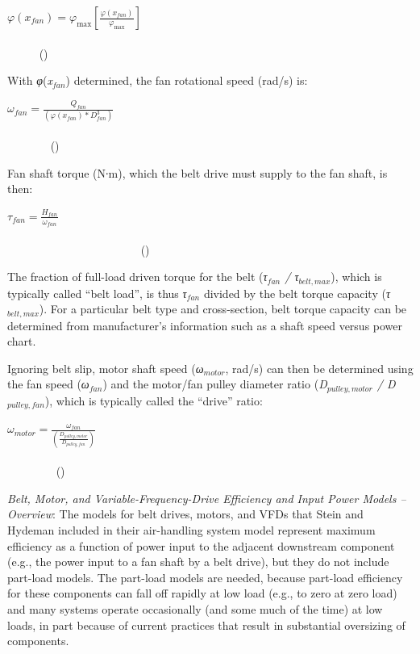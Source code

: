 \(\varphi \left( {{x_{fan}}} \right) = {\varphi_{\max }}\left[ {\frac{{\varphi \left( {{x_{fan}}} \right)}}{{{\varphi_{\max }}}}} \right]\) ~~~~~~~~~~~~~~~~~~~~~~~~~~~~~~~~~~~~~~~~~~~~~~~~~~~~~~~~~~~~~~~~~~~~~~~~~~~~~ ()

With \emph{φ}(\emph{x\(_{fan}\)}) determined, the fan rotational speed (rad/s) is:

\({\omega_{fan}} = \frac{{{Q_{fan}}}}{{\left( {\varphi ({x_{fan}}) * D_{fan}^3} \right)}}\) ~~~~~~~~~~~~~~~~~~~~~~~~~~~~~~~~~~~~~~~~~~~~~~~~~~~~~~~~~~~~~~~~~~~~~~~~~~~~~~~ ()

Fan shaft torque (N∙m), which the belt drive must supply to the fan shaft, is then:

\({\tau_{fan}} = \frac{{{H_{fan}}}}{{{\omega_{fan}}}}\) ~~~~~~~~~~~~~~~~~~~~~~~~~~~~~~~~~~~~~~~~~~~~~~~~~~~~~~~~~~~~~~~~~~~~~~~~~~~~~~~~~~~~~~~~~~~~~~~ ()

The fraction of full-load driven torque for the belt (\emph{τ\(_{fan}\) / τ\(_{belt,max}\)}), which is typically called ``belt load'', is thus \emph{τ\(_{fan}\)} divided by the belt torque capacity (\emph{τ\(_{belt,max}\)}). For a particular belt type and cross-section, belt torque capacity can be determined from manufacturer's information such as a shaft speed versus power chart.

Ignoring belt slip, motor shaft speed (\emph{ω\(_{motor}\)}, rad/s) can then be determined using the fan speed (\emph{ω\(_{fan}\)}) and the motor/fan pulley diameter ratio (\emph{D\(_{pulley,motor}\) / D\(_{pulley,fan}\)}), which is typically called the ``drive'' ratio:

\({\omega_{motor}} = \frac{{{\omega_{fan}}}}{{\left( {\frac{{{D_{pulley,motor}}}}{{{D_{pulley,fan}}}}} \right)}}\) ~~~~~~~~~~~~~~~~~~~~~~~~~~~~~~~~~~~~~~~~~~~~~~~~~~~~~~~~~~~~~~~~~~~~~~~~~~~~~~~~ ()

\emph{Belt, Motor, and Variable-Frequency-Drive Efficiency and Input Power Models -- Overview}: The models for belt drives, motors, and VFDs that Stein and Hydeman included in their air-handling system model represent maximum efficiency as a function of power input to the adjacent downstream component (e.g., the power input to a fan shaft by a belt drive), but they do not include part-load models. The part-load models are needed, because part-load efficiency for these components can fall off rapidly at low load (e.g., to zero at zero load) and many systems operate occasionally (and some much of the time) at low loads, in part because of current practices that result in substantial oversizing of components.

